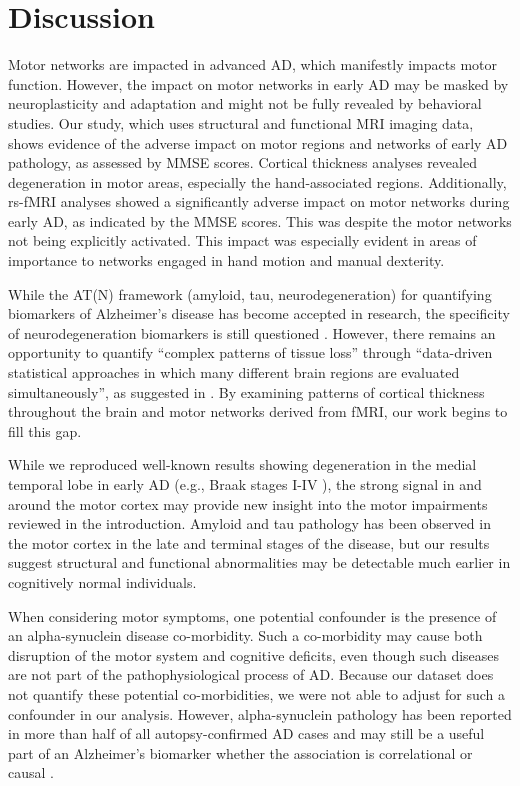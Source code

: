 \documentclass[review,3p,times,12pt,letterpaper]{elsarticle}
\begin{document}
\section*{Discussion}
Motor networks are impacted in advanced AD, which manifestly impacts motor function. However, the impact on motor networks in early AD may be masked by neuroplasticity and adaptation and might not be fully revealed by behavioral studies. Our study, which uses structural and functional MRI imaging data, shows evidence of the adverse impact on motor regions and networks of early AD pathology, as assessed by MMSE scores. Cortical thickness analyses revealed degeneration in motor areas, especially the hand-associated regions. Additionally, rs-fMRI analyses showed a significantly adverse impact on motor networks during early AD, as indicated by the MMSE scores. This was despite the motor networks not being explicitly activated. This impact was especially evident in areas of importance to networks engaged in hand motion and manual dexterity. 

While the AT(N) framework (amyloid, tau, neurodegeneration) for quantifying biomarkers of Alzheimer’s disease has become accepted in research, the specificity of neurodegeneration biomarkers is still questioned \cite{jack_jr_niaaa_2018}. However, there remains an opportunity to quantify ``complex patterns of tissue loss'' through ``data-driven statistical approaches in which many different brain regions are evaluated simultaneously'', as suggested in \cite{albert2011diagnosis}. By examining patterns of cortical thickness throughout the brain and motor networks derived from fMRI, our work begins to fill this gap.

While we reproduced well-known results showing degeneration in the medial temporal lobe in early AD (e.g., Braak stages I-IV \cite{braak1991neuropathological}), the strong signal in and around the motor cortex may provide new insight into the motor impairments reviewed in the introduction. Amyloid and tau pathology has been observed in the motor cortex in the late and terminal stages of the disease, but our results suggest structural and functional abnormalities may be detectable much earlier in cognitively normal individuals.

When considering motor symptoms, one potential confounder is the presence of an alpha-synuclein disease co-morbidity. Such a co-morbidity may cause both disruption of the motor system and cognitive deficits, even though such diseases are not part of the pathophysiological process of AD.  Because our dataset does not quantify these potential co-morbidities, we were not able to adjust for such a confounder in our analysis. However, alpha-synuclein pathology has been reported in more than half of all autopsy-confirmed AD cases \cite{lippa1998lewy} and may still be a useful part of an Alzheimer's biomarker whether the association is correlational or causal \cite{twohig2019alpha}.
\end{document}
